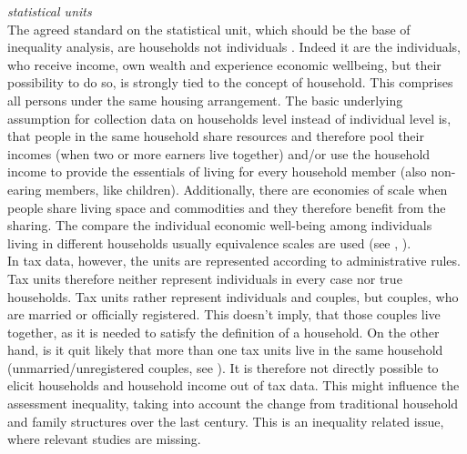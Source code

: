 \documentclass[twoside]{article}\usepackage[]{graphicx}\usepackage[]{color}
\begin{document}
\begin{multicols}{2}
\emph{statistical units} \\

The agreed standard on the statistical unit, which should be the base of inequality analysis, are households not individuals \citep[60]{oecd_oecd_2013 UNSICHER}. Indeed it are the individuals, who receive income, own wealth and experience economic wellbeing, but their possibility to do so, is strongly tied to the concept of household. This comprises all persons under the same housing arrangement. The basic underlying assumption for collection data on households level instead of individual level is, that people in the same household share resources and therefore pool their incomes (when two or more earners live together) and/or use the household income to provide the essentials of living for every household member (also non-earing members, like children). Additionally, there are economies of scale when people share living space and commodities and they therefore benefit from the sharing. The compare the individual economic well-being among individuals living in different households usually equivalence scales are used (see \citealt[173]{oecd_oecd_2013 UNSICHER}, \citealt{Buhmann et al., 1998 FEHLT}). \\

In tax data, however, the units are represented according to administrative rules. Tax units therefore neither represent individuals in every case nor true households. Tax units rather represent individuals and couples, but couples, who are married or officially registered. This doesn't imply, that those couples live together, as it is needed to satisfy the definition of a household. On the other hand, is it quit likely that more than one tax units live in the same household (unmarried/unregistered couples, see \citet[99]{muller_vermogenslage_2014}). It is therefore not directly possible to elicit households and household income out of tax data. This might influence the assessment inequality, taking into account the change from traditional household and family structures over the last century. This is an inequality related issue, where relevant studies are missing.




\end{multicols}
\end{document}
